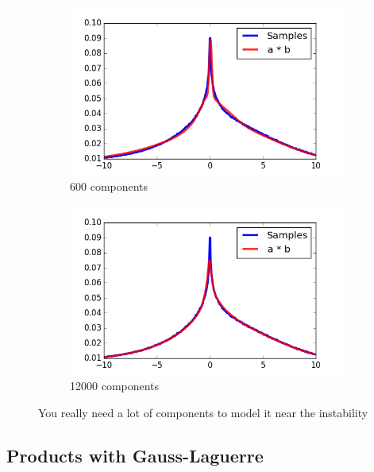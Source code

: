 \documentclass[11pt,a4paper]{book}
\begin{document}
\begin{figure}[h]
  \centering
  \begin{subfigure}[t]{0.45\textwidth}
    \centering
    \includegraphics[width=\textwidth]{thesis/operations/product-hermite-100-components}
    \caption{600 components}
    \label{fig:product-hermite-vars}
  \end{subfigure}
  \hfill
  \begin{subfigure}[t]{0.45\textwidth}
    \centering
    \includegraphics[width=\textwidth]{thesis/operations/product-hermite-2000-components}
    \caption{12000 components}
  \end{subfigure}
  \caption{You really need a lot of components to model it near the instability}
  \label{fig:product-hermite-2}
\end{figure}

\subsection{Products with Gauss-Laguerre}
\end{document}
